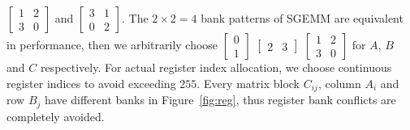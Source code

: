 $\begin{bmatrix} 1 & 2 \\ 3 & 0  \end{bmatrix}$ and
$\begin{bmatrix} 3 & 1 \\ 0 & 2  \end{bmatrix}$.
The $2\times2=4$ bank patterns of SGEMM are equivalent in performance, then we arbitrarily
choose $\begin{bmatrix} 0 \\ 1  \end{bmatrix}$ $\begin{bmatrix} 2 & 3 \end{bmatrix}$
    $\begin{bmatrix} 1 & 2 \\ 3 & 0  \end{bmatrix}$ for $A$, $B$ and $C$ respectively.
For actual register index allocation, we choose continuous register indices to avoid exceeding $255$.
Every matrix block $C_{ij}$, column $A_i$ and row $B_j$ have different banks in Figure~\ref{fig:reg}, thus register bank conflicts are completely avoided.
